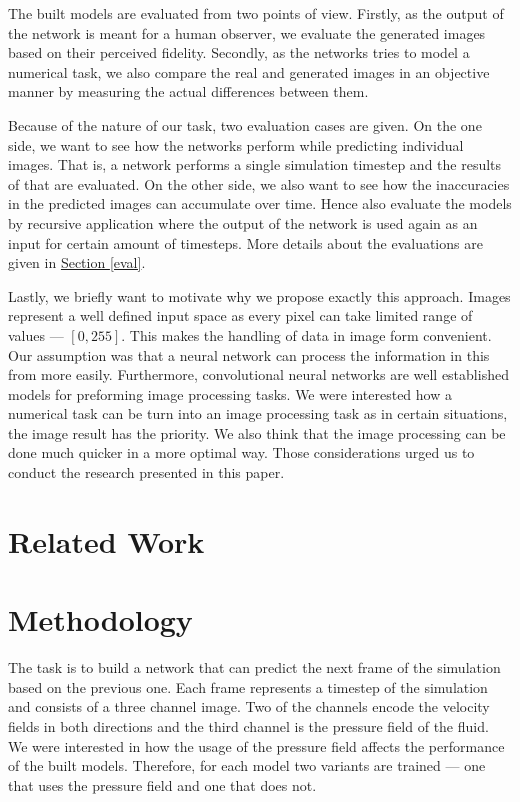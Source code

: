 \documentclass{llncs}
\newcommand{\refsec}[1]{\hyperref[#1]{Section \ref*{#1}}}
\begin{document}
The built models are evaluated from two points of view. Firstly, as the output of the network is meant for a human observer, we evaluate the generated images based on their perceived fidelity. Secondly, as the networks tries to model a numerical task, we also compare the real and generated images in an objective manner by measuring the actual differences between them.

Because of the nature of our task, two evaluation cases are given. On the one side, we want to see how the networks perform while predicting individual images. That is, a network performs a single simulation timestep and the results of that are evaluated. On the other side, we also want to see how the inaccuracies in the predicted images can accumulate over time. Hence also evaluate the models by recursive application where the output of the network is used again as an input for certain amount of timesteps. More details about the evaluations are given in \refsec{eval}.

Lastly, we briefly want to motivate why we propose exactly this approach. Images represent a well defined input space as every pixel can take limited range of values --- $[0, 255]$. This makes the handling of data in image form convenient. Our assumption was that a neural network can process the information in this from more easily. Furthermore, convolutional neural networks are well established models for preforming image processing tasks. We were interested how a numerical task can be turn into an image processing task as in certain situations, the image result has the priority. We also think that the image processing can be done much quicker in a more optimal way. Those considerations urged us to conduct the research presented in this paper.

\section{Related Work}\label{related_work}

\section{Methodology}\label{methodology}
The task is to build a network that can predict the next frame of the simulation based on the previous one. Each frame represents a timestep of the simulation and consists of a three channel image. Two of the channels encode the velocity fields in both directions and the third channel is the pressure field of the fluid. We were interested in how the usage of the pressure field affects the performance of the built models. Therefore, for each model two variants are trained --- one that uses the pressure field and one that does not.
\end{document}

